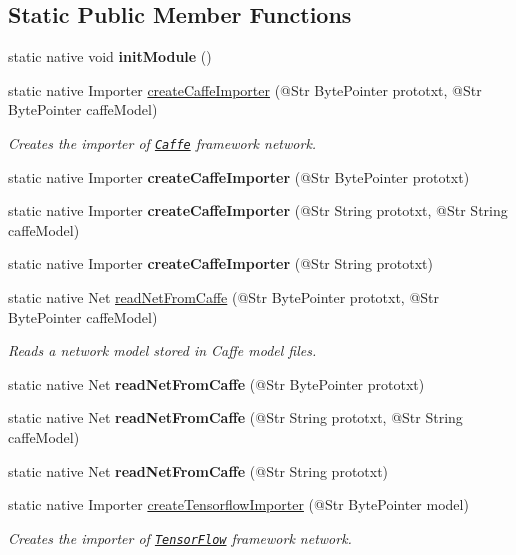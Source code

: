 \subsection*{Static Public Member Functions}
\begin{DoxyCompactItemize}
\item 
static native void {\bfseries init\+Module} ()
\item 
static native Importer \hyperlink{group__dnn_ga277fa41c30459c131b646bdb8951d82b}{create\+Caffe\+Importer} (@Str Byte\+Pointer prototxt, @Str Byte\+Pointer caffe\+Model)
\begin{DoxyCompactList}\small\item\em Creates the importer of \href{http://caffe.berkeleyvision.org}{\tt Caffe} framework network. \end{DoxyCompactList}\item 
static native Importer {\bfseries create\+Caffe\+Importer} (@Str Byte\+Pointer prototxt)
\item 
static native Importer {\bfseries create\+Caffe\+Importer} (@Str String prototxt, @Str String caffe\+Model)
\item 
static native Importer {\bfseries create\+Caffe\+Importer} (@Str String prototxt)
\item 
static native Net \hyperlink{group__dnn_ga228b1b00210018ec3f301f017a00949f}{read\+Net\+From\+Caffe} (@Str Byte\+Pointer prototxt, @Str Byte\+Pointer caffe\+Model)
\begin{DoxyCompactList}\small\item\em Reads a network model stored in Caffe model files. \end{DoxyCompactList}\item 
static native Net {\bfseries read\+Net\+From\+Caffe} (@Str Byte\+Pointer prototxt)
\item 
static native Net {\bfseries read\+Net\+From\+Caffe} (@Str String prototxt, @Str String caffe\+Model)
\item 
static native Net {\bfseries read\+Net\+From\+Caffe} (@Str String prototxt)
\item 
static native Importer \hyperlink{group__dnn_gafb21a0aa44b3feb934bcd5ad4fc708e3}{create\+Tensorflow\+Importer} (@Str Byte\+Pointer model)
\begin{DoxyCompactList}\small\item\em Creates the importer of \href{http://www.tensorflow.org}{\tt Tensor\+Flow} framework network. \end{DoxyCompactList}\item 

\end{DoxyCompactItemize}
